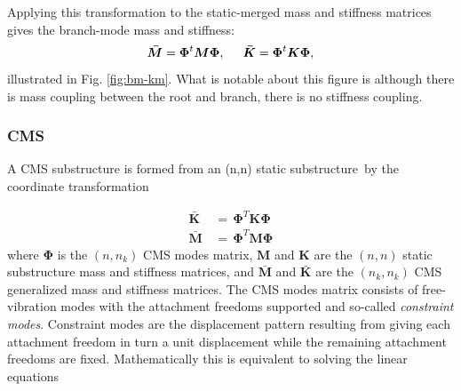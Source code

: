 \documentclass[10pt,openany,twoside]{book}
\numberwithin{equation}{section}   %
\newcommand{\Newterm}[1]{{\em #1}}
\newcommand{\Matrix}[1]{\boldsymbol{#1}}
\newcommand{\Figref}[1]{Fig. \ref{#1}}
\newcommand{\Ss}{substructure}
\begin{document}
Applying this transformation to the static-merged mass and stiffness
matrices gives the branch-mode mass and stiffness:
\begin{equation}
	\Matrix{\bar{M}} = \Matrix{\Phi}^t \Matrix{M} \Matrix{\Phi},\hspace{0.5cm}
	\Matrix{\bar{K}} = \Matrix{\Phi}^t \Matrix{K} \Matrix{\Phi},
\end{equation}
illustrated in \Figref{fig:bm-km}. What is notable about this figure is
although there is mass coupling between the root and branch, there
is no stiffness coupling.

\subsubsection{CMS}
\par
A CMS substructure is formed from an (n,n) static \Ss\
by the coordinate transformation

\begin{equation}\label{eqn:dsstrans}
\begin{split}
\Matrix{\bar{K}} & \, = \, \Matrix{\Phi}^T \Matrix{K} \Matrix{\Phi} \\
\Matrix{\bar{M}} & \, = \, \Matrix{\Phi}^T \Matrix{M} \Matrix{\Phi}
\end{split}
\end{equation}
where $\Matrix{\Phi}$ is the $(n,n_k )$ CMS modes matrix,
$\Matrix{M}$ and $\Matrix{K}$
are the $(n,n)$ static substructure mass and stiffness matrices, and
$\Matrix{\bar{M}}$ and $\Matrix{\bar{K}}$ are the $(n_k , n_k)$
CMS generalized mass and stiffness matrices.
The CMS modes matrix consists of free-vibration
modes with the attachment freedoms supported and so-called
\Newterm{constraint modes}.
Constraint modes are the displacement pattern resulting
from  giving each attachment freedom in turn a unit displacement while
the remaining attachment freedoms are fixed.
Mathematically this is equivalent to solving the linear equations
\end{document}
